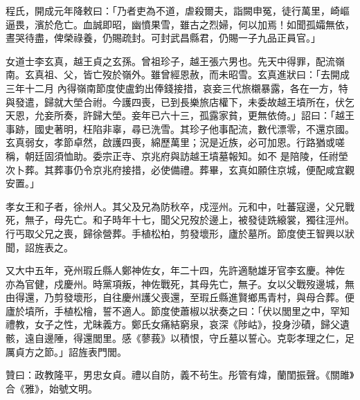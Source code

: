 \begin{pinyinscope}
 程氏，開成元年降敕曰：「乃者吏為不道，虐殺爾夫，詣闕申冤，徒行萬里，崎嶇逼畏，濱於危亡。血誠即昭，幽憤果雪，雖古之烈婦，何以加焉！如聞孤孀無依，晝哭待盡，俾榮祿養，仍賜疏封。可封武昌縣君，仍賜一子九品正員官。」



 女道士李玄真，越王貞之玄孫。曾祖珍子，越王張六男也。先天中得罪，配流嶺南。玄真祖、父，皆亡歿於嶺外。雖曾經恩赦，而未昭雪。玄真進狀曰：「去開成三年十二月
 內得嶺南節度使盧鈞出俸錢接措，哀妾三代旅櫬暴露，各在一方，特與發遣，歸就大塋合祔。今護四喪，已到長樂旅店權下，未委故越王墳所在，伏乞天恩，允妾所奏，許歸大塋。妾年已六十三，孤露家貧，更無依倚。」詔曰：「越王事跡，國史著明，枉陷非辜，尋已洗雪。其珍子他事配流，數代漂零，不還京國。玄真弱女，孝節卓然，啟護四喪，綿歷萬里；況是近族，必可加恩。行路猶或嗟稱，朝廷固須恤助。委宗正寺、京兆府與訪越王墳墓報知。如不
 是陪陵，任祔塋次卜葬。其葬事仍令京兆府接措，必使備禮。葬畢，玄真如願住京城，便配咸宜觀安置。」



 孝女王和子者，徐州人。其父及兄為防秋卒，戍涇州。元和中，吐蕃寇邊，父兄戰死，無子，母先亡。和子時年十七，聞父兄歿於邊上，被發徒跣縗裳，獨往涇州。行丐取父兄之喪，歸徐營葬。手植松柏，剪發壞形，廬於墓所。節度使王智興以狀聞，詔旌表之。



 又大中五年，兗州瑕丘縣人鄭神佐女，年二十四，先許適馳雄牙官李玄慶。神佐
 亦為官健，戍慶州。時黨項叛，神佐戰死，其母先亡，無子。女以父戰歿邊城，無由得還，乃剪發壞形，自往慶州護父喪還，至瑕丘縣進賢鄉馬青村，與母合葬。便廬於墳所，手植松檜，誓不適人。節度使蕭椒以狀奏之曰：「伏以閭里之中，罕知禮教，女子之性，尤昧義方。鄭氏女痛結窮泉，哀深《陟岵》，投身沙磧，歸父遺骸，遠自邊陲，得還閭里。感《蓼莪》以積恨，守丘墓以誓心。克彰孝理之仁，足厲貞方之節。」詔旌表門閭。



 贊曰：政教隆平，男忠女貞。禮以自防，義不茍生。彤管有煒，蘭閨振聲。《關雎》合《雅》，始號文明。



\end{pinyinscope}